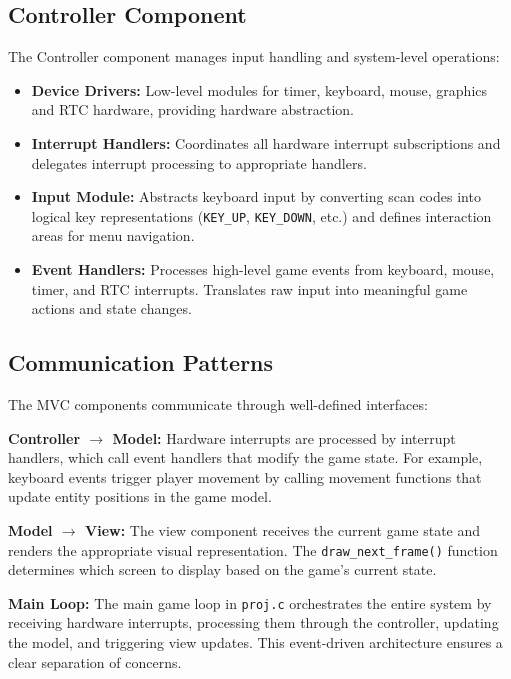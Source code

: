 \documentclass[12pt,a4paper]{article}
\newcommand{\func}[1]{\texttt{#1()}}
\newcommand{\var}[1]{\texttt{#1}}
\newcommand{\file}[1]{\texttt{#1}}
\begin{document}
\subsection{Controller Component}

The Controller component manages input handling and system-level operations:

\begin{itemize}
  \item \textbf{Device Drivers:} Low-level modules for timer, keyboard, mouse, graphics and RTC hardware, providing hardware abstraction.
  \item \textbf{Interrupt Handlers:} Coordinates all hardware interrupt subscriptions and delegates interrupt processing to appropriate handlers.
  \item \textbf{Input Module:} Abstracts keyboard input by converting scan codes into logical key representations (\var{KEY\_UP}, \var{KEY\_DOWN}, etc.) and defines interaction areas for menu navigation.
  \item \textbf{Event Handlers:} Processes high-level game events from keyboard, mouse, timer, and RTC interrupts. Translates raw input into meaningful game actions and state changes.
\end{itemize}

\subsection{Communication Patterns}

The MVC components communicate through well-defined interfaces:

\textbf{Controller $\rightarrow$ Model:} Hardware interrupts are processed by interrupt handlers, which call event handlers that modify the game state. For example, keyboard events trigger player movement by calling movement functions that update entity positions in the game model.

\textbf{Model $\rightarrow$ View:} The view component receives the current game state and renders the appropriate visual representation. The \func{draw\_next\_frame} function determines which screen to display based on the game's current state.

\textbf{Main Loop:} The main game loop in \file{proj.c} orchestrates the entire system by receiving hardware interrupts, processing them through the controller, updating the model, and triggering view updates. This event-driven architecture ensures a clear separation of concerns.
\end{document}
